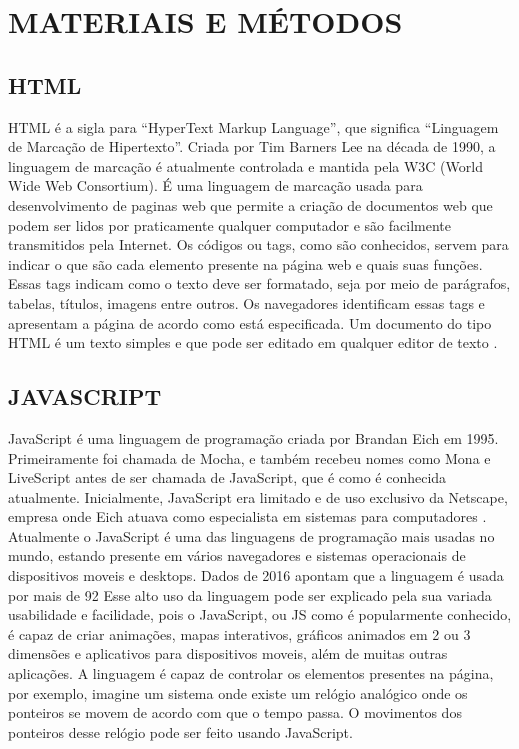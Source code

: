 \section{MATERIAIS E MÉTODOS}
\subsection{HTML}
HTML é a sigla para “HyperText Markup Language”, que significa “Linguagem de Marcação de Hipertexto”. Criada por Tim Barners Lee na década de 1990, a linguagem de marcação é atualmente controlada e mantida pela W3C (World Wide Web Consortium). É uma linguagem de marcação usada para desenvolvimento de paginas web que permite a criação de documentos web que podem ser lidos por praticamente qualquer computador e são facilmente transmitidos pela Internet.
Os códigos ou tags, como são conhecidos, servem para indicar o que são cada elemento presente na página web e quais suas funções. Essas tags indicam como o texto deve ser formatado, seja por meio de parágrafos, tabelas, títulos, imagens entre outros. Os navegadores identificam essas tags e apresentam a página de acordo como está especificada. Um documento do tipo HTML é um texto simples e que pode ser editado em qualquer editor de texto \cite{Andrei2019}.

\subsection{JAVASCRIPT}
JavaScript é uma linguagem de programação criada por Brandan Eich em 1995. Primeiramente foi chamada de Mocha, e também recebeu nomes como Mona e LiveScript antes de ser chamada de JavaScript, que é como é conhecida atualmente. Inicialmente, JavaScript era limitado e de uso exclusivo da Netscape, empresa onde Eich atuava como especialista em sistemas para computadores \cite{Andrei2019a}. 
Atualmente o JavaScript é uma das linguagens de programação mais usadas no mundo, estando presente em vários navegadores e sistemas operacionais de dispositivos moveis e desktops. Dados de 2016 apontam que a linguagem é usada por mais de 92%
Esse alto uso da linguagem pode ser explicado pela sua variada usabilidade e facilidade, pois o JavaScript, ou JS como é popularmente conhecido, é capaz de criar animações, mapas interativos, gráficos animados em 2 ou 3 dimensões e aplicativos para dispositivos moveis, além de muitas outras aplicações. A linguagem é capaz de controlar os elementos presentes na página, por exemplo, imagine um sistema onde existe um relógio analógico onde os ponteiros se movem de acordo com que o tempo passa. O movimentos dos ponteiros desse relógio pode ser feito usando JavaScript.

